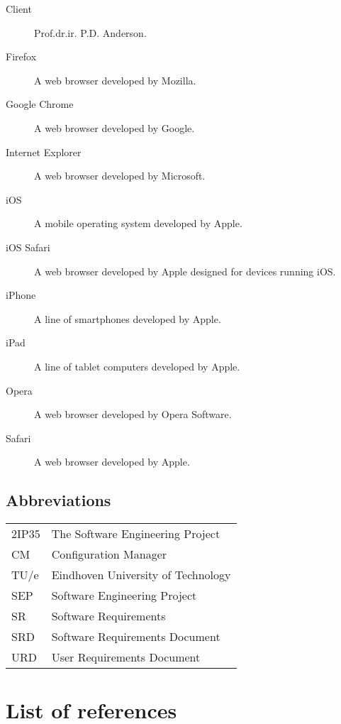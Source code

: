 \begin{description}
\item[Client] Prof.dr.ir. P.D. Anderson.
\item[Firefox] A web browser developed by Mozilla.
\item[Google Chrome] A web browser developed by Google.
\item[Internet Explorer] A web browser developed by Microsoft.
\item[iOS] A mobile operating system developed by Apple.
\item[iOS Safari] A web browser developed by Apple designed for devices running iOS.
\item[iPhone] A line of smartphones developed by Apple.
\item[iPad] A line of tablet computers developed by Apple.
\item[Opera] A web browser developed by Opera Software.
\item[Safari] A web browser developed by Apple.
\end{description}

\subsection{Abbreviations}
\begin{tabular}{l|l}
2IP35 & The Software Engineering Project \\
CM    &Configuration Manager \\
TU/e  &Eindhoven University of Technology \\
SEP   &Software Engineering Project \\
SR    &Software Requirements \\
SRD & Software Requirements Document \\
URD   &User Requirements Document \\
\end{tabular}

\section{List of references}





